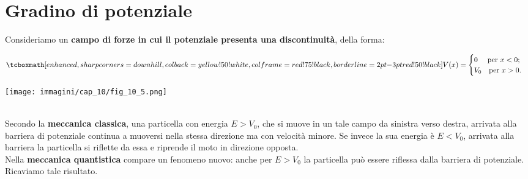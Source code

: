 \documentclass[a4paper,12pt,oneside]{book}
\begin{document}
\section{Gradino di potenziale}
Consideriamo un \textbf{campo di forze in cui il potenziale presenta una discontinuità}, della forma:\\
\begin{minipage}{.55\textwidth}
	\begin{equation}
		\tcboxmath[enhanced, sharp corners=downhill, colback=yellow!50!white, colframe=red!75!black, borderline={2pt}{-3pt}{red!50!black}]{
			V(x)=
			\begin{cases}
			0 \quad \textrm{ per } x<0;\\
			V_0 \quad \textrm{per } x>0.
			\end{cases}
			}
	\end{equation}
\end{minipage}
\hspace{.2cm}
\begin{minipage}{.4\textwidth}
\texttt{[image: immagini/cap\_10/fig\_10\_5.png]}
\end{minipage}\\

Secondo la \textbf{meccanica classica}, una particella con energia $E>V_0$, che si muove in un tale campo da sinistra verso destra, arrivata alla barriera di potenziale continua a muoversi nella stessa direzione ma con velocità minore. Se invece la sua energia è $E<V_0$, arrivata alla barriera la particella si riflette da essa e riprende il moto in direzione opposta.\\

Nella \textbf{meccanica quantistica} compare un fenomeno nuovo: anche per $E>V_0$ la particella può essere riflessa dalla barriera di potenziale. Ricaviamo tale risultato.\\
\end{document}
